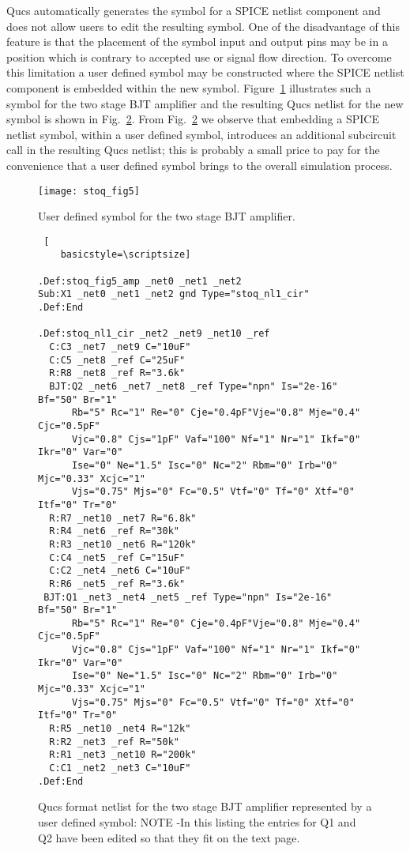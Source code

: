 Qucs automatically generates the symbol for a SPICE netlist component and does not allow users to edit the resulting symbol. One of the disadvantage of this feature is that the placement of the symbol input and output pins may be in a position which is contrary to accepted use or signal flow direction. To overcome this limitation a user defined symbol may be constructed where the SPICE netlist component is embedded within the new symbol. Figure~\ref{fig:stoq_fig5} illustrates such a symbol for the two stage BJT amplifier and the resulting Qucs netlist for the new symbol is shown in Fig.~\ref{fig:stoq_fig6}. From Fig.~\ref{fig:stoq_fig6} we observe that embedding a SPICE netlist symbol, within a user defined symbol, introduces an additional subcircuit call in the resulting Qucs netlist; this is probably a small price to pay for the convenience that a user defined symbol brings to the overall simulation process.\begin{figure}
  \centering
  \texttt{[image: stoq\_fig5]}
  \caption{User defined symbol for the two stage BJT amplifier. }
  \label{fig:stoq_fig5}
\end{figure} 



\begin{figure}
  \centering
  \begin{lstlisting} [
    basicstyle=\scriptsize]
  
.Def:stoq_fig5_amp _net0 _net1 _net2
Sub:X1 _net0 _net1 _net2 gnd Type="stoq_nl1_cir"
.Def:End

.Def:stoq_nl1_cir _net2 _net9 _net10 _ref
  C:C3 _net7 _net9 C="10uF"
  C:C5 _net8 _ref C="25uF"
  R:R8 _net8 _ref R="3.6k"
  BJT:Q2 _net6 _net7 _net8 _ref Type="npn" Is="2e-16" Bf="50" Br="1" 
      Rb="5" Rc="1" Re="0" Cje="0.4pF"Vje="0.8" Mje="0.4" Cjc="0.5pF" 
      Vjc="0.8" Cjs="1pF" Vaf="100" Nf="1" Nr="1" Ikf="0" Ikr="0" Var="0"
      Ise="0" Ne="1.5" Isc="0" Nc="2" Rbm="0" Irb="0" Mjc="0.33" Xcjc="1" 
      Vjs="0.75" Mjs="0" Fc="0.5" Vtf="0" Tf="0" Xtf="0" Itf="0" Tr="0"
  R:R7 _net10 _net7 R="6.8k"
  R:R4 _net6 _ref R="30k"
  R:R3 _net10 _net6 R="120k"
  C:C4 _net5 _ref C="15uF"
  C:C2 _net4 _net6 C="10uF"
  R:R6 _net5 _ref R="3.6k"
 BJT:Q1 _net3 _net4 _net5 _ref Type="npn" Is="2e-16" Bf="50" Br="1"
      Rb="5" Rc="1" Re="0" Cje="0.4pF"Vje="0.8" Mje="0.4" Cjc="0.5pF" 
      Vjc="0.8" Cjs="1pF" Vaf="100" Nf="1" Nr="1" Ikf="0" Ikr="0" Var="0"
      Ise="0" Ne="1.5" Isc="0" Nc="2" Rbm="0" Irb="0" Mjc="0.33" Xcjc="1" 
      Vjs="0.75" Mjs="0" Fc="0.5" Vtf="0" Tf="0" Xtf="0" Itf="0" Tr="0"
  R:R5 _net10 _net4 R="12k"
  R:R2 _net3 _ref R="50k"
  R:R1 _net3 _net10 R="200k"
  C:C1 _net2 _net3 C="10uF"
.Def:End
\end{lstlisting}
  \caption{Qucs format netlist for the two stage BJT amplifier represented by a user defined symbol: NOTE -In this listing the entries for Q1 and Q2 have been edited so that they fit on the text page.}
  \label{fig:stoq_fig6}
\end{figure} 


